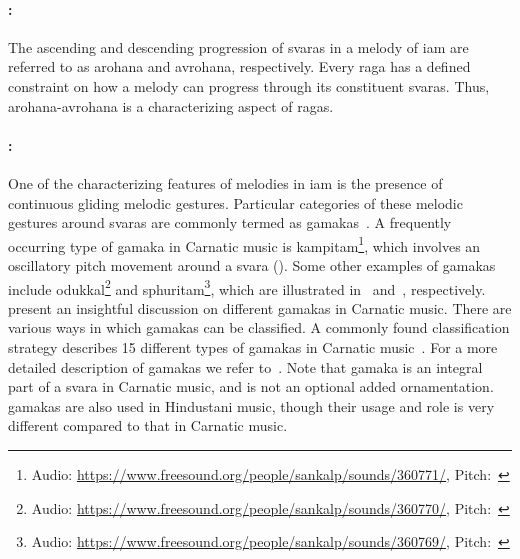 \paragraph{:}

The ascending and descending progression of \glspl{svara} in a melody of \gls{iam} are referred to as \gls{arohana} and \gls{avrohana}, respectively. Every \gls{raga} has a defined constraint on how a melody can progress through its constituent \glspl{svara}. Thus, \gls{arohana}-\gls{avrohana} is a characterizing aspect of \glspl{raga}.

\paragraph{:} One of the characterizing features of melodies in \gls{iam} is the presence of continuous gliding melodic gestures. Particular categories of these melodic gestures around \glspl{svara} are commonly termed as \glspl{gamaka}~\citep{krishna2012carnatic}. A frequently occurring type of \gls{gamaka} in Carnatic music is \gls{kampitam}\footnote{Audio: \url{https://www.freesound.org/people/sankalp/sounds/360771/}, Pitch:~}, which involves an oscillatory pitch movement around a \gls{svara} (). Some other examples of \glspl{gamaka} include \gls{odukkal}\footnote{Audio: \url{https://www.freesound.org/people/sankalp/sounds/360770/}, Pitch:~} and \gls{sphuritam}\footnote{Audio: \url{https://www.freesound.org/people/sankalp/sounds/360769/}, Pitch:~}, which are illustrated in~ and~, respectively. \cite{krishna2012carnatic} present an insightful discussion on different \glspl{gamaka} in Carnatic music. There are various ways in which \glspl{gamaka} can be classified. A commonly found classification strategy describes 15 different types of \glspl{gamaka} in Carnatic music~\citep{ramanathan1999musical,janakiraman2008essentials,narayanswami2011}. For a more detailed description of \glspl{gamaka} we refer to~\cite{narayanswami2011}. Note that \gls{gamaka} is an integral part of a \gls{svara} in Carnatic music, and is not an optional added ornamentation. \Glspl{gamaka} are also used in Hindustani music, though their usage and role is very different compared to that in Carnatic music. 


